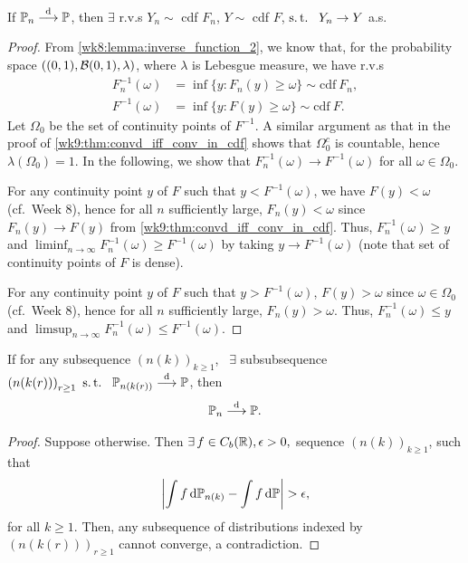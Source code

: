 \documentclass[12pt]{article}
\begin{document}
\begin{Lemma}
If $\P_n \convd \P$, then $\exists$ r.v.s $Y_n \sim$ cdf $F_n$, $Y \sim$ cdf $F$, $\st\ Y_n \to Y$ a.s.
\end{Lemma}
%
\begin{proof}
From \cref{wk8:lemma:inverse_function_2}, we know that, for the probability space $\left( (0, 1), \mathcal{B} (0, 1), \lambda \right)$, where $\lambda$ is Lebesgue measure, we have r.v.s 
\begin{align*}
F_n^{-1}(\omega) &= \inf \big\{y: F_n(y) \geq \omega\big\} \sim \text{cdf}\ F_n, \\
F^{-1}(\omega) &= \inf \big\{y: F(y) \geq \omega\big\} \sim \text{cdf}\ F.
\end{align*}
Let $\Omega_0$ be the set of continuity points of $F^{-1}$. A similar argument as that in the proof of \cref{wk9:thm:convd_iff_conv_in_cdf} shows that $\Omega_0^c$ is countable, hence $\lambda(\Omega_0)=1$. In the following, we show that $F_n^{-1}(\omega) \to F^{-1}(\omega)$ for all $\omega\in\Omega_0$.

For any continuity point $y$ of $F$ such that $y < F^{-1}(\omega)$, we have $F(y) < \omega$ (cf.\ Week 8), hence for all $n$ sufficiently large, $F_n(y) < \omega$ since $F_n(y)\to F(y)$ from \cref{wk9:thm:convd_iff_conv_in_cdf}. Thus, $F_n^{-1}(\omega) \geq y$ and $\liminf_{n\to\infty}F_n^{-1}(\omega) \geq F^{-1}(\omega)$ by taking $y\to F^{-1}(\omega)$ (note that set of continuity points of $F$ is dense).
 
For any continuity point $y$ of $F$ such that $y > F^{-1}(\omega)$, $F(y) > \omega$ since $\omega\in\Omega_0$ (cf.\ Week 8), hence for all $n$ sufficiently large, $F_n(y) > \omega$. Thus, $F_n^{-1}(\omega) \leq y$ and $\limsup_{n\to\infty}F_n^{-1}(\omega) \leq F^{-1}(\omega)$.
\end{proof}
%
\begin{Lemma} \label{wk9:lemma:subseq_convd_implies_seq_convd}
If for any subsequence $\left(n(k)\right)_{k \geq 1}$, \ $\exists$ subsubsequence $\left(n(k(r))\right)_{r \geq 1}\ \st\ \P_{n(k(r))} \convd \P$, then
\begin{align*}
\P_n \convd \P.
\end{align*}
\end{Lemma}
\begin{proof}
Suppose otherwise. Then $\exists f \in C_b(\bbR), \epsilon > 0,$ sequence $\left(n(k)\right)_{k \geq 1}$, such that
\begin{align*}
\left| \int f \ud \P_{n(k)} - \int f \ud \P \right| > \epsilon,
\end{align*}
for all $k\geq1$. Then, any subsequence of distributions indexed by $(n(k(r)))_{r\geq 1}$ cannot converge, a contradiction.
\end{proof}
\end{document}
